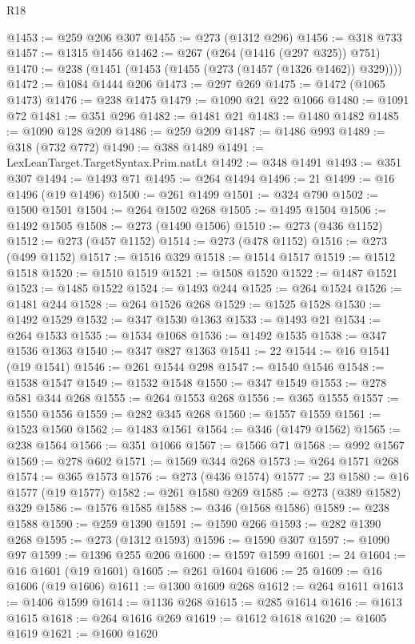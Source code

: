 \begin{lexlean}{R18}
\begin{coremodule}
{{{{{{{{{{{{{{{{{{{{{{{{{{{{{{{{{{{{{{{{{{{{{{{{{{{{{{{{{{{{{{{{{{{{{{{{{{{{{{{{{{{{{{{{{{{{{{{{{{{{{{{{{{{{{{{{{{{{{{{{{{{{{{{{{{{{{{{{{{{{{{{@1453 := @259 @206 @307
@1455 := @273 (@1312 @296)
@1456 := @318 @733
@1457 := @1315 @1456
@1462 := @267 (@264 (@1416 (@297 @325)) @751)
@1470 := @238 (@1451 (@1453 (@1455 (@273 (@1457 (@1326 @1462)) @329))))
@1472 := @1084 @1444 @206
@1473 := @297 @269
@1475 := @1472 (@1065 @1473)
@1476 := @238 @1475
@1479 := @1090 @21 @22 @1066
@1480 := @1091 @72
@1481 := @351 @296
@1482 := @1481 @21
@1483 := @1480 @1482
@1485 := @1090 @128 @209
@1486 := @259 @209
@1487 := @1486 @993
@1489 := @318 (@732 @772)
@1490 := @388 @1489
@1491 := LexLeanTarget.TargetSyntax.Prim.natLt
@1492 := @348 @1491
@1493 := @351 @307
@1494 := @1493 @71
@1495 := @264 @1494
@1496 := 21
@1499 := @16 @1496 (@19 @1496)
@1500 := @261 @1499
@1501 := @324 @790
@1502 := @1500 @1501
@1504 := @264 @1502 @268
@1505 := @1495 @1504
@1506 := @1492 @1505
@1508 := @273 (@1490 @1506)
@1510 := @273 (@436 @1152)
@1512 := @273 (@457 @1152)
@1514 := @273 (@478 @1152)
@1516 := @273 (@499 @1152)
@1517 := @1516 @329
@1518 := @1514 @1517
@1519 := @1512 @1518
@1520 := @1510 @1519
@1521 := @1508 @1520
@1522 := @1487 @1521
@1523 := @1485 @1522
@1524 := @1493 @244
@1525 := @264 @1524
@1526 := @1481 @244
@1528 := @264 @1526 @268
@1529 := @1525 @1528
@1530 := @1492 @1529
@1532 := @347 @1530 @1363
@1533 := @1493 @21
@1534 := @264 @1533
@1535 := @1534 @1068
@1536 := @1492 @1535
@1538 := @347 @1536 @1363
@1540 := @347 @827 @1363
@1541 := 22
@1544 := @16 @1541 (@19 @1541)
@1546 := @261 @1544 @298
@1547 := @1540 @1546
@1548 := @1538 @1547
@1549 := @1532 @1548
@1550 := @347 @1549
@1553 := @278 @581 @344 @268
@1555 := @264 @1553 @268
@1556 := @365 @1555
@1557 := @1550 @1556
@1559 := @282 @345 @268
@1560 := @1557 @1559
@1561 := @1523 @1560
@1562 := @1483 @1561
@1564 := @346 (@1479 @1562)
@1565 := @238 @1564
@1566 := @351 @1066
@1567 := @1566 @71
@1568 := @992 @1567
@1569 := @278 @602
@1571 := @1569 @344 @268
@1573 := @264 @1571 @268
@1574 := @365 @1573
@1576 := @273 (@436 @1574)
@1577 := 23
@1580 := @16 @1577 (@19 @1577)
@1582 := @261 @1580 @269
@1585 := @273 (@389 @1582) @329
@1586 := @1576 @1585
@1588 := @346 (@1568 @1586)
@1589 := @238 @1588
@1590 := @259 @1390
@1591 := @1590 @266
@1593 := @282 @1390 @268
@1595 := @273 (@1312 @1593)
@1596 := @1590 @307
@1597 := @1090 @97
@1599 := @1396 @255 @206
@1600 := @1597 @1599
@1601 := 24
@1604 := @16 @1601 (@19 @1601)
@1605 := @261 @1604
@1606 := 25
@1609 := @16 @1606 (@19 @1606)
@1611 := @1300 @1609 @268
@1612 := @264 @1611
@1613 := @1406 @1599
@1614 := @1136 @268
@1615 := @285 @1614
@1616 := @1613 @1615
@1618 := @264 @1616 @269
@1619 := @1612 @1618
@1620 := @1605 @1619
@1621 := @1600 @1620
}}}}}}}}}}}}}}}}}}}}}}}}}}}}}}}}}}}}}}}}}}}}}}}}}}}}}}}}}}}}}}}}}}}}}}}}}}}}}}}}}}}}}}}}}}}}}}}}}}}}}}}}}}}}}}}}}}}}}}}}}}}}}}}}}}}}}}}}}}}}}}}
\end{coremodule}
\end{lexlean}

